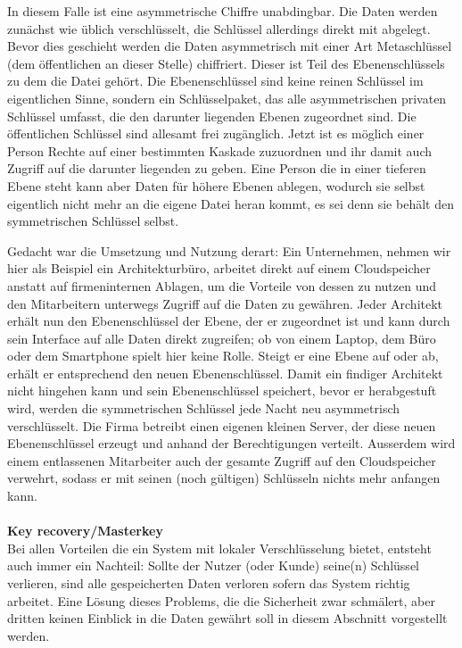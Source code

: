 \documentclass[13pt,a4paper,bibliography=totocnumbered,listof=totocnumbered]{scrartcl}
\begin{document}
In diesem Falle ist eine asymmetrische Chiffre unabdingbar. Die Daten werden zunächst wie üblich verschlüsselt, die Schlüssel allerdings direkt mit abgelegt. Bevor dies geschieht werden die Daten asymmetrisch mit einer Art Metaschlüssel (dem öffentlichen an dieser Stelle) chiffriert. Dieser ist Teil des Ebenenschlüssels zu dem die Datei gehört. Die Ebenenschlüssel sind keine reinen Schlüssel im eigentlichen Sinne, sondern ein Schlüsselpaket, das alle asymmetrischen privaten Schlüssel umfasst, die den darunter liegenden Ebenen zugeordnet sind. Die öffentlichen Schlüssel sind allesamt frei zugänglich. Jetzt ist es möglich einer Person Rechte auf einer bestimmten Kaskade zuzuordnen und ihr damit auch Zugriff auf die darunter liegenden zu geben. Eine Person die in einer tieferen Ebene steht kann aber Daten für höhere Ebenen ablegen, wodurch sie selbst eigentlich nicht mehr an die eigene Datei heran kommt, es sei denn sie behält den symmetrischen Schlüssel selbst.

Gedacht war die Umsetzung und Nutzung derart: Ein Unternehmen, nehmen wir hier als Beispiel ein Architekturbüro, arbeitet direkt auf einem Cloudspeicher anstatt auf firmeninternen Ablagen, um die Vorteile von dessen zu nutzen und den Mitarbeitern unterwegs Zugriff auf die Daten zu gewähren. Jeder Architekt erhält nun den Ebenenschlüssel der Ebene, der er zugeordnet ist und kann durch sein Interface auf alle Daten direkt zugreifen; ob von einem Laptop, dem Büro oder dem Smartphone spielt hier keine Rolle. Steigt er eine Ebene auf oder ab, erhält er entsprechend den neuen Ebenenschlüssel. Damit ein findiger Architekt nicht hingehen kann und sein Ebenenschlüssel speichert, bevor er herabgestuft wird, werden die symmetrischen Schlüssel jede Nacht neu asymmetrisch verschlüsselt. Die Firma betreibt einen eigenen kleinen Server, der diese neuen Ebenenschlüssel erzeugt und anhand der Berechtigungen verteilt. Ausserdem wird einem entlassenen Mitarbeiter auch der gesamte Zugriff auf den Cloudspeicher verwehrt, sodass er mit seinen (noch gültigen) Schlüsseln nichts mehr anfangen kann.\\
\\\textbf{Key recovery/Masterkey}\\
Bei allen Vorteilen die ein System mit lokaler Verschlüsselung bietet, entsteht auch immer ein Nachteil: Sollte der Nutzer (oder Kunde) seine(n) Schlüssel verlieren, sind alle gespeicherten Daten verloren sofern das System richtig arbeitet. Eine Lösung dieses Problems, die die Sicherheit zwar schmälert, aber dritten keinen Einblick in die Daten gewährt soll in diesem Abschnitt vorgestellt werden.
\end{document}
